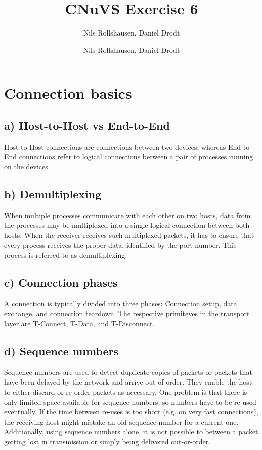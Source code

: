 \documentclass[a4paper, 11 pt, article, accentcolor=tud7b]{tudreport}
\title{CNuVS Exercise 6}
\author{Nils Rollshausen, Daniel Drodt}
\subtitle{Nils Rollshausen, Daniel Drodt}
\begin{document}
	\maketitle
	\section{Connection basics}
	\subsection*{a) Host-to-Host vs End-to-End}
	Host-to-Host connections are connections between two devices, whereas End-to-End connections refer to logical connections between a pair of processes running on the devices.
	  
	\subsection*{b) Demultiplexing}
	When multiple processes communicate with each other on two hosts, data from the processes may be multiplexed into a single logical connection between both hosts. When the receiver receives such multiplexed packets, it has to ensure that every process receives the proper data, identified by the port number. This process is referred to as demultiplexing.
	
	\subsection*{c) Connection phases}
	A connection is typically divided into three phases: Connection setup, data exchange, and connection teardown. The respective primiteves in the transport layer are T-Connect, T-Data, and T-Disconnect.
	
	\subsection*{d) Sequence numbers}
	Sequence numbers are used to detect duplicate copies of packets or packets that have been delayed by the network and arrive out-of-order. They enable the host to either discard or re-order packets as necessary. One problem is that there is only limited space available for sequence numbers, so numbers have to be re-used eventually. If the time between re-uses is too short (e.g. on very fast connections), the receiving host might mistake an old sequence number for a current one. \\
	Additionally, using sequence numbers alone, it is not possible to between a packet getting lost in transmission or simply being delivered out-or-order.
	
\end{document}
